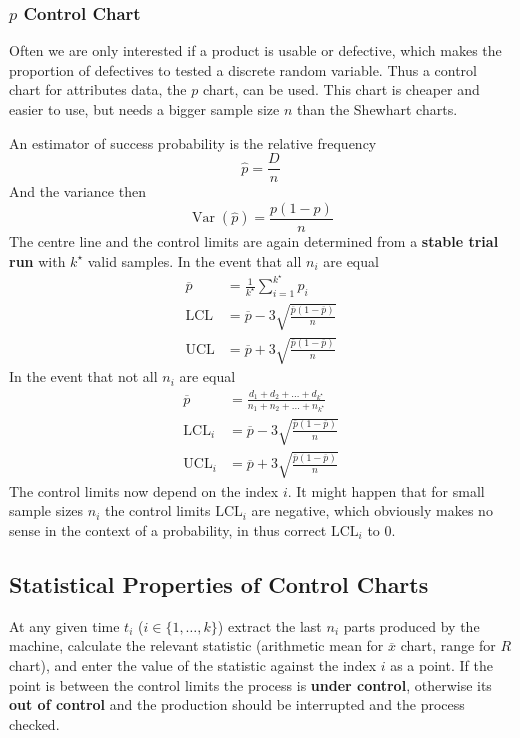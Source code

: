 \documentclass[11pt]{article}
\theoremstyle{definition}
\newcommand*\samplemean[1]{\overline{#1}}
\newcommand*\Var[1]{\mathop{\text{Var}}\left(#1\right)}
\begin{document}
\subsubsection{$p$ Control Chart}
Often we are only interested if a product is usable or defective, which makes the proportion of defectives to tested a discrete random variable. Thus a control chart for attributes data, the $p$ chart, can be used. This chart is cheaper and easier to use, but needs a bigger sample size $n$ than the Shewhart charts.

\vspace{1em}
\noindent
An estimator of success probability is the relative frequency
\begin{equation*}
	\hat{p} = \frac{D}{n}
\end{equation*}
And the variance then
\begin{equation*}
	\Var{\hat{p}} = \frac{p(1-p)}{n}
\end{equation*}
The centre line and the control limits are again determined from a \textbf{stable trial run} with $k^\star$ valid samples. In the event that all $n_i$ are equal
\begin{align*}
	\samplemean{p} &= \frac{1}{k^\star}\sum_{i=1}^{k^\star}p_i\\
	\text{LCL} &= \samplemean{p} - 3 \sqrt{\frac{\samplemean{p}(1-\samplemean{p})}{n}}\\
	\text{UCL} &= \samplemean{p} + 3 \sqrt{\frac{\samplemean{p}(1-\samplemean{p})}{n}}
\end{align*}
In the event that not all $n_i$ are equal
\begin{align*}
	\samplemean{p} &= \frac{d_1 + d_2 + \dots + d_{k^\star}}{n_1 + n_2 + \dots + n_{k^\star}}\\
	\text{LCL}_i &= \samplemean{p} - 3 \sqrt{\frac{\samplemean{p}(1-\samplemean{p})}{n}}\\
	\text{UCL}_i &= \samplemean{p} + 3 \sqrt{\frac{\samplemean{p}(1-\samplemean{p})}{n}}
\end{align*}
The control limits now depend on the index $i$. It might happen that for small sample sizes $n_i$ the control limits $\text{LCL}_i$ are negative, which obviously makes no sense in the context of a probability, in thus correct $\text{LCL}_i$ to $0$.

\subsection{Statistical Properties of Control Charts}
At any given time $t_i$ ($i\in\{1,\dots,k\}$) extract the last $n_i$ parts produced by the machine, calculate the relevant statistic (arithmetic mean for $\samplemean{x}$ chart, range for $R$ chart), and enter the value of the statistic against the index $i$ as a point. If the point is between the control limits the process is \textbf{under control}, otherwise its \textbf{out of control} and the production should be interrupted and the process checked.
\end{document}

